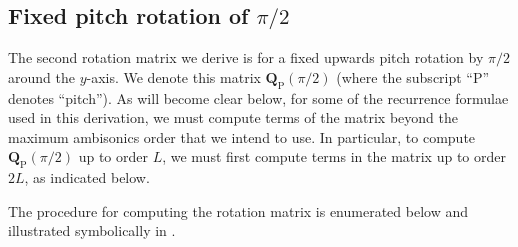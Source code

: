 \subsection{Fixed pitch rotation of \texorpdfstring{$\pi/2$}{pi/2}}
The second rotation matrix we derive is for a fixed upwards pitch rotation by $\pi/2$ around the $y$-axis.
We denote this matrix $\mathbf{Q}_\text{P}(\pi/2)$ (where the subscript ``$\text{P}$'' denotes ``pitch'').
As will become clear below, for some of the recurrence formulae used in this derivation, we must compute terms of the matrix beyond the maximum ambisonics order that we intend to use.
In particular, to compute $\mathbf{Q}_\text{P}(\pi/2)$ up to order $L$, we must first compute terms in the matrix up to order $2L$, as indicated below.

The procedure for computing the rotation matrix is enumerated below and illustrated symbolically in .

